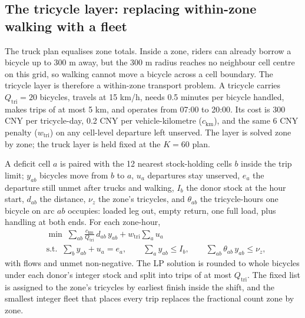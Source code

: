 \subsection{The tricycle layer: replacing within-zone walking with a fleet}

The truck plan equalises zone totals. Inside a zone, riders can already borrow a
bicycle up to 300 m away, but the 300 m radius reaches no neighbour cell centre on this
grid, so walking cannot move a bicycle across a cell boundary. The tricycle layer is
therefore a within-zone transport problem. A tricycle carries $Q_{\text{tri}}=20$
bicycles, travels at 15 km/h, needs 0.5 minutes per bicycle handled, makes trips of at
most 5 km, and operates from 07:00 to 20:00. Its cost is 300 CNY per tricycle-day,
0.2 CNY per vehicle-kilometre ($c_{\text{km}}$), and the same 6 CNY penalty
($w_{\text{tri}}$) on any cell-level departure left unserved. The layer is solved zone
by zone; the truck layer is held fixed at the $K=60$ plan.

A deficit cell $a$ is paired with the 12 nearest
stock-holding cells $b$ inside the trip limit; $y_{ab}$ bicycles move from $b$ to $a$,
$u_a$ departures stay unserved, $e_a$ the departure still unmet after trucks and
walking, $I_b$ the donor stock at the hour start, $d_{ab}$ the distance,
$\nu_z$ the zone's tricycles, and $\theta_{ab}$ the tricycle-hours one bicycle on
arc $ab$ occupies: loaded leg out, empty return, one full load, plus handling at both
ends. For each zone-hour,
\begin{equation}
\begin{aligned}
&\min\;\sum_{ab}\frac{c_{\text{km}}}{Q_{\text{tri}}}\,d_{ab}\,y_{ab}
  +w_{\text{tri}}\sum_a u_a\\
&\text{s.t.}\;\;\sum_b y_{ab}+u_a=e_a,\qquad
\sum_a y_{ab}\le I_b,\qquad
\sum_{ab}\theta_{ab}\,y_{ab}\le\nu_z ,
\end{aligned}
\label{eq:q2tri}
\end{equation}
with flows and unmet non-negative. The LP solution is rounded to whole bicycles under
each donor's integer stock and split into trips of at most $Q_{\text{tri}}$. The fixed
list is assigned to the zone's tricycles by earliest finish inside the shift, and the
smallest integer fleet that places every trip replaces the fractional count zone by zone.

